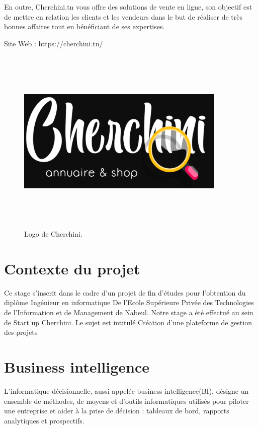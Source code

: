 \bigskip
 En outre, Cherchini.tn vous offre des solutions de vente en ligne, son objectif
est de mettre en relation les clients et les vendeurs dans le but de r\'{e}aliser de
tr\`{e}s bonnes affaires tout en b\'{e}n\'{e}ficiant de ses expertises.

Site Web : https://cherchini.tn/

\bigskip

  \FloatBarrier
\begin{figure}[H]
\center
\includegraphics[width=10cm,height=9cm]{./figures/cherchini-logo.png}
\caption{Logo de Cherchini.}

\end{figure}
  \FloatBarrier

\section{ Contexte du projet }
Ce stage s'inscrit dans le cadre d'un projet de fin d'\'{e}tudes pour l'obtention du
dipl\^{o}me Ing\'{e}nieur en informatique De l'Ecole Sup\'{e}rieure Priv\'{e}e des
Technologies de l'Information et de Management de Nabeul.
Notre stage a \'{e}t\'{e} effectu\'{e} au sein de Start up Cherchini.
Le sujet est intitul\'{e} \guillemotleft{}Cr\'{e}ation d'une plateforme de gestion des projets\guillemotright{}

\section{Business intelligence}
 L'informatique d\'{e}cisionnelle, aussi appel\'{e}e business intelligence(BI), d\'{e}signe un ensemble de m\'{e}thodes, de moyens et d'outils informatiques utilis\'{e}s pour piloter une entreprise et aider \`{a} la prise de d\'{e}cision : tableaux de bord, rapports analytiques et prospectifs.

